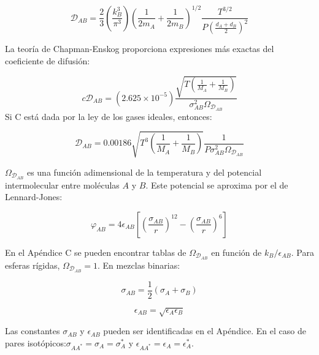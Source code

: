 \begin{equation}
\mathscr{D}_{AB} = \frac{2}{3} \left( \frac{k_B^3}{\pi^3} \right) \left( \frac{1}{2 m_A} + \frac{1}{2 m_B} \right)^{1/2} \frac{T^{3/2}}{P \left( \frac{d_A + d_B}{2} \right)^2}\tag{1.44}\label{eq_1.44}
\end{equation}

La teoría de Chapman-Enskog proporciona expresiones más exactas del coeficiente de difusión:

\begin{equation}
c \mathscr{D}_{AB} = (2.625 \times 10^{-5}) \frac{\sqrt{T(\frac{1}{M_A}+\frac{1}{M_B})}}{\sigma_{AB}^2 \Omega_{\mathscr{D}_{AB}}}\tag{1.45}\label{eq_1.45}
\end{equation}
Si C está dada por la ley de los gases ideales, entonces:

\begin{equation}
\mathscr{D}_{AB} = 0.00186 \sqrt{T^3(\frac{1}{M_A}+\frac{1}{M_B})}\frac{1}{P \sigma_{AB}^2 \Omega_{\mathscr{D}_{AB}}}  \tag{1.46}\label{eq_1.46}
\end{equation}

\(\Omega_{\mathscr{D}_{AB}}\) es una función adimensional de la temperatura y del potencial intermolecular entre moléculas \( A \) y \( B \). Este potencial se aproxima por el de Lennard-Jones:

\begin{equation}
\varphi_{AB}=4 \epsilon_{AB}[(\frac{\sigma_{AB}}{r})^{12}-(\frac{\sigma_{AB}}{r})^6]  \tag{1.47}\label{eq_1.47}
\end{equation}

En el Apéndice C se pueden encontrar tablas de \( \Omega_{\mathscr{D}_{AB}} \) en función de \( k_B / \epsilon_{AB} \). Para esferas rígidas, \( \Omega_{\mathscr{D}_{AB}} = 1 \). En mezclas binarias:

\begin{equation}
\sigma_{AB} = \frac{1}{2} (\sigma_A+\sigma_B)\tag{1.48}\label{eq_1.48}
\end{equation}

\begin{equation}
\epsilon_{AB} = \sqrt{\epsilon_A \epsilon_B}\tag{1.49}\label{eq_1.49}
\end{equation}

Las constantes $\sigma_{AB}$ y \( \epsilon_{AB} \) pueden ser identificadas en el Apéndice. En el caso de pares isotópicos:$\sigma_{AA^*}=\sigma_A=\sigma_A^*$  y  $\epsilon_{AA^*}=\epsilon_A=\epsilon_A^*$.




